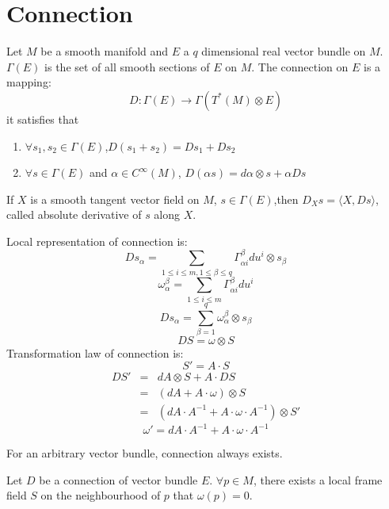 \section{Connection}
\begin{newdef}[Connection] 
Let $M$ be a smooth manifold and $E$ a $q$ dimensional real vector bundle on $M$. $\Gamma(E)$ is the set of all smooth sections of $E$ on $M$. The connection on $E$ is a mapping:
\[D:\Gamma(E) \to \Gamma(T^*(M) \otimes E)\]
it satisfies that
\begin{enumerate}
\item $\forall s_1 ,s_2 \in \Gamma(E)$,$D(s_1+s_2) = Ds_1+Ds_2$
\item $\forall s \in \Gamma(E)$ and $\alpha \in C^{\infty}(M)$, $D(\alpha s) = d\alpha \otimes s + \alpha Ds$
\end{enumerate}
If $X$ is a smooth tangent vector field on $M$, $s \in \Gamma(E)$,then
$D_{X}s = \langle X, Ds \rangle$, called absolute derivative of $s$ along $X$.
\end{newdef}

\vspace{50pt}

\begin{newprop}
Local representation of connection is: 
\[Ds_{\alpha} = \sum_{1 \leq i \leq m,1 \leq \beta \leq q} \Gamma^{\beta}_{\alpha i} du^i \otimes s_{\beta}\]
\[\omega^{\beta}_{\alpha} = \sum_{1 \leq i \leq m} \Gamma^{\beta}_{\alpha i} du^i\]
\[Ds_{\alpha} = \sum_{\beta=1}^{q} \omega^{\beta}_{\alpha} \otimes s_{\beta}\]
\[DS = \omega \otimes S\]
Transformation law of connection is:
\[S' = A \cdot S\] 
\begin{eqnarray}
DS' &=& dA \otimes S + A \cdot DS \nonumber \\
&=& (dA + A \cdot \omega) \otimes S \nonumber \\
&=& (dA \cdot A^{-1} + A \cdot \omega \cdot A^{-1}) \otimes S' \nonumber
\end{eqnarray}
\[\omega' = dA \cdot A^{-1} + A \cdot \omega \cdot A^{-1}\]
\end{newprop}

\begin{newthem}
For an arbitrary vector bundle, connection always exists.
\end{newthem}

\begin{newthem} 
Let $D$ be a connection of vector bundle $E$. $\forall p \in M$, there exists a local frame field $S$ on the neighbourhood of $p$ that $\omega(p) =0$.
\end{newthem}

